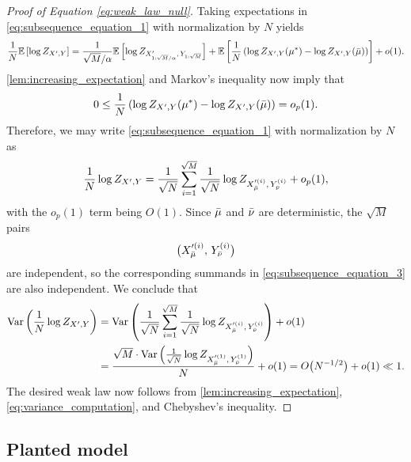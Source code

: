 \documentclass[11pt]{amsart}
\numberwithin{equation}{section}
\numberwithin{equation}{section}
\newcommand{\1}{\mathbbm{1}}
\newcommand{\E}{\mathbb{E}}
\newcommand{\Var}{\textup{Var}}
\theoremstyle{definition}
\begin{document}
\begin{proof}[Proof of Equation \eqref{eq:weak_law_null}]
    Taking expectations in \eqref{eq:subsequence_equation_1} with normalization by $N$ yields
    \begin{align*}
        \frac{1}{N} \E\left[ \log Z_{X',Y} \right] = \frac{1}{\sqrt{M}/\alpha} \E\left[ \log Z_{X'_{1:\sqrt{M}/\alpha},\, Y_{1:\sqrt{M}}} \right] + \E\left[\frac{1}{N}\left(\log Z_{X', Y}(\mu^*) - \log Z_{X', Y}(\Bar{\mu}) \right)\right] + o(1).
    \end{align*}
    \cref{lem:increasing_expectation} and Markov's inequality now imply that
    \begin{align} \label{eq:discrepancy_from_max}
        0 \leq \frac{1}{N}\left(\log Z_{X', Y}(\mu^*) - \log Z_{X', Y}(\Bar{\mu}) \right) = o_p(1).
    \end{align}
    Therefore, we may write \eqref{eq:subsequence_equation_1} with normalization by $N$ as
    \begin{align} \label{eq:subsequence_equation_3}
        \frac{1}{N}\log Z_{X',Y} = \frac{1}{\sqrt{N}} \sum_{i=1}^{\sqrt{M}} \frac{1}{\sqrt{N}} \log Z_{X_{\Bar{\mu}}'^{(i)},\, Y_{\Bar{\nu}}^{(i)}} + o_p(1),
    \end{align}
    with the $o_p(1)$ term being $O(1)$. Since $\Bar{\mu}$ and $\Bar{\nu}$ are deterministic, the $\sqrt{M}$ pairs 
    \begin{align*}
        \big( X_{\Bar{\mu}}'^{(i)},\, Y_{\Bar{\nu}}^{(i)} \big)
    \end{align*}
    are independent, so the corresponding summands in \eqref{eq:subsequence_equation_3} are also independent. We conclude that
    \begin{align} 
        \Var\left(\frac{1}{N}\log Z_{X',Y}\right) & = \Var\left( \frac{1}{\sqrt{N}} \sum_{i=1}^{\sqrt{M}} \frac{1}{\sqrt{N}} \log Z_{X_{\Bar{\mu}}'^{(i)},\, Y_{\Bar{\nu}}^{(i)}} \right) + o(1) \nonumber \\
        & = \frac{\sqrt{M} \cdot \Var\left( \frac{1}{\sqrt{N}} \log Z_{X_{\Bar{\mu}}'^{(1)},\, Y_{\Bar{\nu}}^{(1)}} \right)}{N} + o(1) = O\big( N^{-1/2} \big) + o(1) \ll 1. \label{eq:variance_computation}
    \end{align}
    The desired weak law now follows from  \cref{lem:increasing_expectation}, \eqref{eq:variance_computation}, and Chebyshev's inequality.
\end{proof}

\subsection{Planted model}
\end{document}
